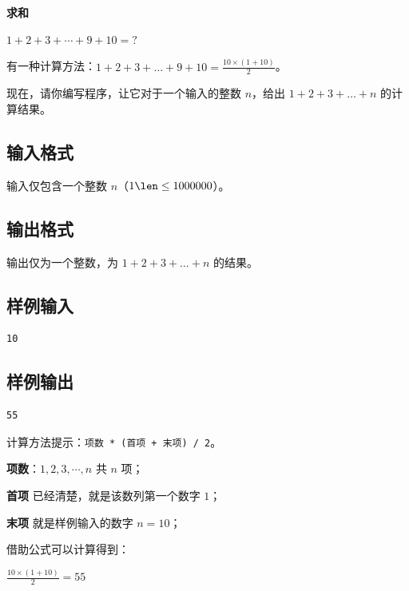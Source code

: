 \documentclass{article}
\newcommand{\problemname}[1]{\begin{center}\Large\bfseries #1\end{center}}
\begin{document}
\problemname{求和}

$1+2+3+\cdots+9+10=?$

有一种计算方法：$1+2+3+\ldots+9+10=\frac{10\times(1+10)}{2}$。

现在，请你编写程序，让它对于一个输入的整数 $n$，给出 $1+2+3+\ldots+n$ 的计算结果。

\subsection*{输入格式}
输入仅包含一个整数 $n$（$1\len\le1000000$）。

\subsection*{输出格式}
输出仅为一个整数，为 $1+2+3+\ldots+n$ 的结果。

\subsection*{样例输入}
\begin{verbatim}
10
\end{verbatim}

\subsection*{样例输出}
\begin{verbatim}
55
\end{verbatim}

计算方法提示：\texttt{项数 * (首项 + 末项) / 2}。

\textbf{项数}：$1,2,3,\cdots\text{},n$ 共 $n$ 项；

\textbf{首项} 已经清楚，就是该数列第一个数字 $1$；

\textbf{末项} 就是样例输入的数字 $n=10$；

借助公式可以计算得到：

$\frac{10\times(1+10)}{2}=55$
\end{document}
